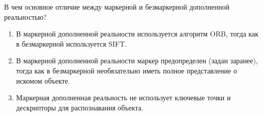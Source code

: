 
В чем основное отличие между маркерной и безмаркерной дополненной реальностью?

\begin{enumerate}
    \item В маркерной дополненной реальности используется алгоритм ORB, тогда как в безмаркерной используется SIFT.
    \item В маркерной дополненной реальности маркер предопределен (задан заранее), тогда как в безмаркерной необязательно иметь полное представление о искомом объекте.
    \item Маркерная дополненная реальность не использует ключевые точки и дескрипторы для распознавания объекта.
\end{enumerate}